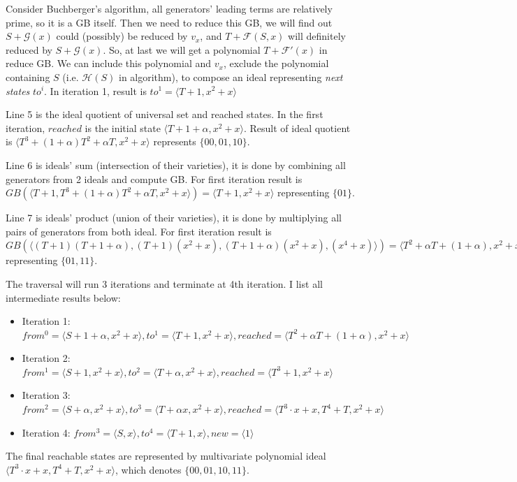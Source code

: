 \begin{Example}
Consider Buchberger's algorithm, all generators' leading terms are relatively prime, so it is a GB itself. 
Then we need to reduce this GB, we will find out $S + \mathcal G(x)$ could (possibly) be reduced by $v_x$,
and $T+\mathcal F(S,x)$ will definitely reduced by $S + \mathcal G(x)$. So, at last we will get a polynomial
$T + \mathcal F'(x)$ in reduce GB. We can include this polynomial and $v_x$, exclude the polynomial containing
$S$ (i.e. $\mathcal H(S)$ in algorithm), to compose an ideal representing \emph{next states} $to^i$. 
In iteration 1, result is $to^1 = \langle T+1, x^2+x\rangle$

Line 5 is the ideal quotient of universal set and reached states. In the first iteration, 
$reached$ is the initial state $\langle T+1+\alpha, x^2+x \rangle$. Result of ideal quotient
is $\langle T^3+(1+\alpha)T^2+\alpha T, x^2+x\rangle$ represents $\{00,01,10\}$.

Line 6 is ideals' sum (intersection of their varieties), it is done by combining all generators
from 2 ideals and compute GB. For first iteration result is $GB(\langle T+1,T^3+(1+\alpha)T^2+\alpha T, x^2+x\rangle) = \langle T+1, x^2+x\rangle$ representing $\{01\}$.

Line 7 is ideals' product (union of their varieties), it is done by multiplying all pairs of
generators from both ideal. For first iteration result is $GB(\langle (T+1)(T+1+\alpha),
(T+1)(x^2+x), (T+1+\alpha)(x^2+x), (x^4+x)\rangle) = \langle T^2+\alpha T+(1+\alpha), x^2+x\rangle$ representing $\{01,11\}$.

The traversal will run 3 iterations and terminate at 4th iteration. I list all intermediate 
results below:
\begin{itemize}
\item Iteration 1: $from^0 = \langle S+1+\alpha, x^2+x\rangle, to^1 = \langle T+1, x^2+x\rangle,
 reached = \langle T^2+\alpha T+(1+\alpha), x^2+x\rangle$
\item Iteration 2: $from^1 = \langle S+1, x^2+x\rangle, to^2= \langle T+\alpha, x^2+x\rangle,
reached = \langle T^3+1, x^2+x\rangle$
\item Iteration 3: $from^2 = \langle S+\alpha, x^2+x\rangle, to^3 = \langle T+\alpha x, x^2+x
\rangle, reached = \langle T^3\cdot x+x, T^4+T, x^2+x\rangle$
\item Iteration 4: $from^3 = \langle S, x\rangle, to^4 = \langle T+1, x\rangle, new = \langle1\rangle$
\end{itemize}
The final reachable states are represented by multivariate polynomial ideal $\langle T^3\cdot x+x, T^4+T, x^2+x\rangle$,
which denotes $\{00,01,10,11\}$.
\end{Example}

